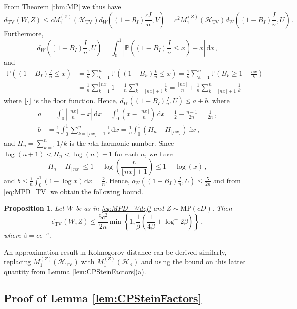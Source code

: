 \documentclass[12pt]{article}
\newtheorem{proposition}[theorem]{Proposition}
\begin{document}
From Theorem \ref{thm:MP} we thus have
\begin{equation}\label{eq:MPD_TV}
d_\text{TV}(W,Z)\leq cM_1^{(Z)}(\mathcal{H}_\text{TV})d_W\left((1-B_I)\frac{cI}{n},V\right)= c^2M_1^{(Z)}(\mathcal{H}_\text{TV})d_W\left((1-B_I)\frac{I}{n},U\right)\,.
\end{equation}
Furthermore,
\[
d_W\left((1-B_I)\frac{I}{n},U\right)=\int_0^1\left|\mathbb{P}\left((1-B_I)\frac{I}{n}\leq x\right)-x\right|\,\text{d}x\,,
\]
and
\begin{align*}
\mathbb{P}\left((1-B_I)\frac{I}{n}\leq x\right)&=\frac{1}{n}\sum_{k=1}^n\mathbb{P}\left((1-B_k)\frac{k}{n}\leq x\right)=\frac{1}{n}\sum_{k=1}^n\mathbb{P}\left(B_k\geq1-\frac{nx}{k}\right)\\
&=\frac{1}{n}\sum_{k=1}^{\lfloor nx\rfloor}1+\frac{1}{n}\sum_{k=\lfloor nx\rfloor+1}^n\frac{1}{k}
=\frac{\lfloor nx\rfloor}{n}+\frac{1}{n}\sum_{k=\lfloor nx\rfloor+1}^n\frac{1}{k}\,,
\end{align*}
where $\lfloor\cdot\rfloor$ is the floor function. Hence, $d_W\left((1-B_I)\frac{I}{n},U\right)\leq a+b$, where
\begin{align*}
a&=\int_0^1\left|\frac{\lfloor nx\rfloor}{n}-x\right|\,\text{d}x=\int_0^1\left(x-\frac{\lfloor nx\rfloor}{n}\right)\,\text{d}x=\frac{1}{2}-\frac{n-1}{2n}=\frac{1}{2n}\,,\\
b&=\frac{1}{n}\int_0^1\sum_{k=\lfloor nx\rfloor+1}^n\frac{1}{k}\,\text{d}x=\frac{1}{n}\int_0^1\left(H_n-H_{\lfloor nx\rfloor}\right)\,\text{d}x\,,
\end{align*}
and $H_n=\sum_{k=1}^n1/k$ is the $n$th harmonic number. Since $\log(n+1)<H_n<\log(n)+1$ for each $n$, we have
\[
H_n-H_{\lfloor nx\rfloor}\leq1+\log\left(\frac{n}{\lfloor nx\rfloor+1}\right)\leq1-\log(x)\,,
\]
and $b\leq\frac{1}{n}\int_0^1(1-\log x)\,\text{d}x=\frac{2}{n}$. Hence, $d_W\left((1-B_I)\frac{I}{n},U\right)\leq\frac{5}{2n}$ and from \eqref{eq:MPD_TV} we obtain the following bound.
\begin{proposition}
Let $W$ be as in \eqref{eq:MPD_Wdef} and $Z\sim\text{MP}(cD)$. Then
\[
d_\text{TV}(W,Z)\leq\frac{5c^2}{2n}\min\left\{1,\frac{1}{\beta}\left(\frac{1}{4\beta}+\log^+2\beta\right)\right\}\,,
\]
where $\beta=ce^{-c}$.
\end{proposition}
An approximation result in Kolmogorov distance can be derived similarly, replacing $M_1^{(Z)}(\mathcal{H}_\text{TV})$ with $M_1^{(Z)}(\mathcal{H}_\text{K})$ and using the bound on this latter quantity from Lemma \ref{lem:CPSteinFactors}(a). 

\subsection{Proof of Lemma \ref{lem:CPSteinFactors}}\label{subsec:CPSteinFactors}
\end{document}
